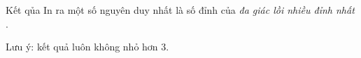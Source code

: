 Kết qủa
In ra một số nguyên duy nhất là số đỉnh của   \textit{    đa giác lồi nhiều đỉnh nhất   }   .  

   Lưu ý: kết quả luôn không nhỏ hơn 3.